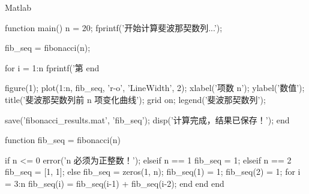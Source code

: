 \documentclass[12pt]{article}
\begin{document}
\begin{mycode}{Matlab}

function main()
    n = 20;                     %
    fprintf('开始计算斐波那契数列...\n');
    
    fib_seq = fibonacci(n);
    
    for i = 1:n
        fprintf('第 %
    end
    
    figure(1);
    plot(1:n, fib_seq, 'r-o', 'LineWidth', 2);
    xlabel('项数 n');
    ylabel('数值');
    title('斐波那契数列前 n 项变化曲线');
    grid on;
    legend('斐波那契数列');
    
    save('fibonacci_results.mat', 'fib_seq');
    disp('计算完成，结果已保存！');
end

function fib_seq = fibonacci(n)
    
    if n <= 0
        error('n 必须为正整数！');
    elseif n == 1
        fib_seq = 1;
    elseif n == 2
        fib_seq = [1, 1];
    else
        fib_seq = zeros(1, n);
        fib_seq(1) = 1;
        fib_seq(2) = 1;
        for i = 3:n
            fib_seq(i) = fib_seq(i-1) + fib_seq(i-2);
        end
    end
end
\end{mycode}
\end{document}
